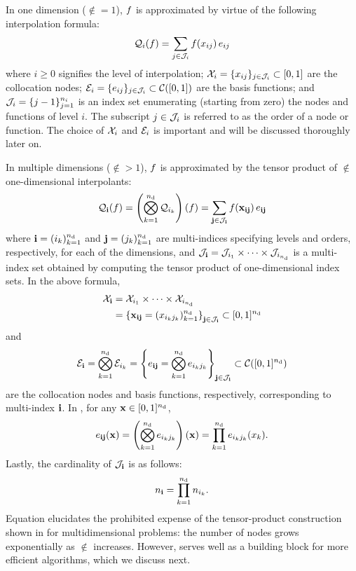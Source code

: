 In one dimension ($\nin = 1$), $f$ is approximated by virtue of the following
interpolation formula:
\begin{equation} \elab{tensor-1d}
  \tensor{i}(\f) = \sum_{j \in \oindex_i} \f(\x_{ij}) \, \e_{ij}
\end{equation}
where $i \geq 0$ signifies the level of interpolation; $\mathcal{X}_i = \{ x_{ij} \}_{j
\in \mathcal{J}_i} \subset [0, 1]$ are the collocation nodes; $\mathcal{E}_i = \{ e_{ij}
\}_{j \in \mathcal{J}_i} \subset \mathcal{C}([0, 1])$ are the basis functions; and
$\mathcal{J}_i = \{ j - 1 \}_{j = 1}^{n_i}$ is an index set enumerating (starting
from zero) the nodes and functions of level $i$. The subscript $j \in \mathcal{J}_i$
is referred to as the order of a node or function. The choice of $\mathcal{X}_i$ and
$\mathcal{E}_i$ is important and will be discussed thoroughly later on.

In multiple dimensions ($\nin > 1$), $f$ is approximated by the tensor product
of $\nin$ one-dimensional interpolants:
\begin{equation} \elab{tensor}
  \tensor{\vi}(\f) = \left( \bigotimes_{k = 1}^\nin \tensor{i_k} \right)(\f) = \sum_{\vj \in \oindex_\vi} \f(\vx_{\vi\vj}) \, \e_{\vi\vj}
\end{equation}
where $\mathbf{i} = (i_k)_{k = 1}^{n_\text{d}}$ and $\mathbf{j} = (j_k)_{k = 1}^{n_\text{d}}$ are
multi-indices specifying levels and orders, respectively, for each of the
dimensions, and $\mathcal{J}_{\mathbf{i}} = \mathcal{J}_{i_1} \times \cdots \times
\mathcal{J}_{i_{n_\text{d}}}$ is a multi-index set obtained by computing the tensor product
of one-dimensional index sets. In the above formula,
\begin{align}
  \X_\vi &= \X_{i_1} \times \cdots \times \X_{i_\nin} \elab{collocation-nodes} \\
         &= \left\{ \vx_{\vi\vj} = (\x_{i_k j_k})_{k = 1}^\nin \right\}_{\vj \in \oindex_\vi} \subset [0, 1]^\nin \nonumber
\end{align}
and
\begin{equation} \elab{basis-functions}
  \E_\vi = \bigotimes_{k = 1}^\nin \E_{i_k}
         = \left\{ \e_{\vi\vj} = \bigotimes_{k = 1}^\nin \e_{i_k j_k} \right\}_{\vj \in \oindex_\vi} \subset \continuous([0, 1]^\nin)
\end{equation}
are the collocation nodes and basis functions, respectively, corresponding to
multi-index $\mathbf{i}$. In , for any $\mathbf{x} \in [0, 1]^{n_\text{d}}$,
\begin{equation} \elab{basis-function}
  \e_{\vi\vj}(\vx) = \left( \bigotimes_{k = 1}^\nin \e_{i_k j_k} \right)(\vx) = \prod_{k = 1}^\nin \e_{i_k j_k}(\x_k).
\end{equation}
Lastly, the cardinality of $\mathcal{J}_{\mathbf{i}}$ is as follows:
\begin{equation} \elab{tensor-cardinality}
  \n_\vi = \prod_{k = 1}^\nin \n_{i_k}.
\end{equation}
Equation  elucidates the prohibited expense of the
tensor-product construction shown in  for multidimensional
problems: the number of nodes grows exponentially as $\nin$ increases. However,
 serves well as a building block for more efficient algorithms,
which we discuss next.

